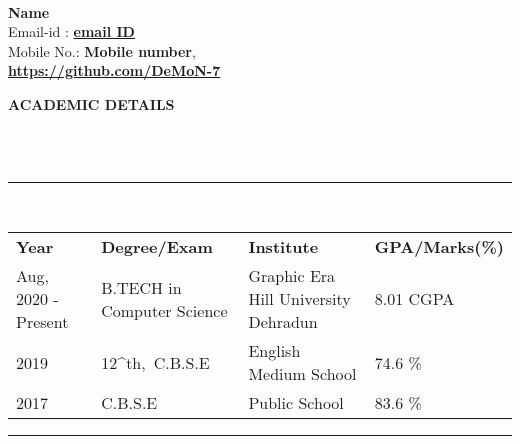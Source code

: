 \documentclass[a4paper,10pt]{article}
\newcommand{\lsep}{-0.5cm}
\newcommand{\resheading}[1]{{\small \colorbox{mygrey}{\begin{minipage}{0.975\textwidth}{\textbf{#1 \vphantom{p\^{E}}}}\end{minipage}}}}
\begin{document}
\hspace{0.5cm}\\[-0.2cm]

\textbf{Name} \\
\indent Email-id : \textbf{\url{email ID}} \\
\indent Mobile No.: \textbf{Mobile number}, \ \\
\indent \textbf{\url{https://github.com/DeMoN-7}}\\

\resheading{\textbf{ACADEMIC DETAILS} }\\[\lsep]
\\
\indent \rule{6.8in}{0.4pt}\\
\indent \begin{tabular}{ l @{\hskip 0.15in} l @{\hskip 0.15in} l @{\hskip 0.15in} l @{\hskip 0.15in} }
\noindent \textbf{Year} & \textbf{Degree/Exam} & \textbf{Institute} & \textbf{GPA/Marks(\%)}\\Aug, 2020 - Present & B.TECH in Computer Science & Graphic Era Hill University Dehradun & 8.01 CGPA \\
2019 & 12^{th},\ C.B.S.E &  English Medium School & 74.6 \% \\
2017 & C.B.S.E &  Public School & 83.6 \%\\

\end{tabular}
\indent \rule{6.8in}{0.4pt}
\\
\end{document}

